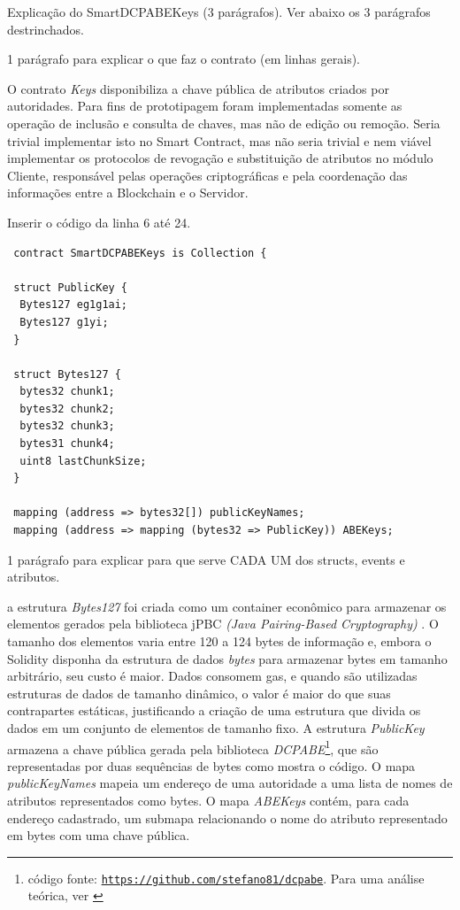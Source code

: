 \documentclass[a4paper,11pt]{article}
\begin{document}
{\color{ForestGreen} Explicação do  SmartDCPABEKeys (3 parágrafos). Ver abaixo os 3 parágrafos destrinchados.}

{\color{Magenta} 1 parágrafo para explicar o que faz o contrato (em linhas gerais).}

O contrato \emph{Keys} disponibiliza a chave pública de atributos criados por autoridades.
Para fins de prototipagem foram implementadas somente as operação de inclusão e consulta de chaves, mas não de edição ou remoção. Seria trivial implementar isto no Smart Contract, mas não seria trivial e nem viável implementar os protocolos de revogação e substituição de atributos no módulo Cliente, responsável pelas operações criptográficas e pela coordenação das informações entre a Blockchain e o Servidor.

{\color{Magenta} Inserir o código da linha 6 até 24.}

\begin{lstlisting}
 contract SmartDCPABEKeys is Collection {

 struct PublicKey {
  Bytes127 eg1g1ai;
  Bytes127 g1yi;
 }

 struct Bytes127 {
  bytes32 chunk1;
  bytes32 chunk2;
  bytes32 chunk3;
  bytes31 chunk4;
  uint8 lastChunkSize;
 }

 mapping (address => bytes32[]) publicKeyNames;
 mapping (address => mapping (bytes32 => PublicKey)) ABEKeys;
\end{lstlisting}

{\color{Magenta} 1 parágrafo para explicar para que serve CADA UM dos structs, events e atributos.}

a estrutura \emph{Bytes127} foi criada como um container econômico para armazenar os elementos gerados pela biblioteca jPBC \emph{(Java Pairing-Based Cryptography)} \cite{DeCaro2011}.
O tamanho dos elementos varia entre 120 a 124 bytes de informação e, embora o Solidity disponha da estrutura de dados \emph{bytes} para armazenar bytes em tamanho arbitrário, seu custo é maior.
Dados consomem gas, e quando são utilizadas estruturas de dados de tamanho dinâmico, o valor é maior do que suas contrapartes estáticas, justificando a criação de uma estrutura que divida os dados em um conjunto de elementos de tamanho fixo.
A estrutura \emph{PublicKey} armazena a chave pública gerada pela biblioteca \emph{DCPABE}\footnote{código fonte: \href{https://github.com/stefano81/dcpabe}{\texttt{https://github.com/stefano81/dcpabe}}. Para uma análise teórica, ver \cite{Lewko2011}}, que são representadas por duas sequências de bytes como mostra o código.
O mapa \emph{publicKeyNames} mapeia um endereço de uma autoridade a uma lista de nomes de atributos representados como bytes.
O mapa \emph{ABEKeys} contém, para cada endereço cadastrado, um submapa relacionando o nome do atributo representado em bytes com uma chave pública.
\end{document}
